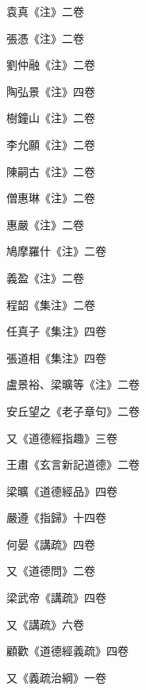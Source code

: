 \begin{pinyinscope}
 袁真《注》二卷



 張憑《注》二卷



 劉仲融《注》二卷



 陶弘景《注》四卷



 樹鐘山《注》二卷



 李允願《注》二卷



 陳嗣古《注》二卷



 僧惠琳《注》二卷



 惠嚴《注》二卷



 鳩摩羅什《注》二卷



 義盈《注》二卷



 程韶《集注》二卷



 任真子《集注》四卷



 張道相《集注》四卷



 盧景裕、梁曠等《注》二卷



 安丘望之《老子章句》二卷



 又《道德經指趣》三卷



 王肅《玄言新記道德》二卷



 梁曠《道德經品》四卷



 嚴遵《指歸》十四卷



 何晏《講疏》四卷



 又《道德問》二卷



 梁武帝《講疏》四卷



 又《講疏》六卷



 顧歡《道德經義疏》四卷



 又《義疏治綱》一卷




\end{pinyinscope}
